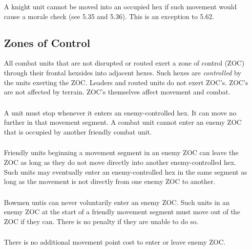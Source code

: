 \subsubsection[Knights and Stacking]{} A knight unit cannot be moved into an occupied hex if such movement would cause a morale check (see 5.35 and 5.36). This is an exception to 5.62.

\subsection{Zones of Control}

All combat units that are not disrupted or routed exert a zone of control (ZOC) through their frontal hexsides into adjacent hexes. Such hexes are \textit{controlled} by the units exerting the ZOC. Leaders and routed units do not exert ZOC's. ZOC's are not affected by terrain. ZOC's themselves affect movement and combat.

\subsubsection[Stopping Movement]{} A unit must stop whenever it enters an enemy-controlled hex. It can move no further in that movement segment. A combat unit cannot enter an enemy ZOC that is occupied by another friendly combat unit.

\subsubsection[Leaving a ZOC]{} Friendly units beginning a movement segment in an enemy ZOC can leave the ZOC as long as they do not move directly into another enemy-controlled hex. Such units may eventually enter an enemy-controlled hex in the same segment as long as the movement is not directly from one enemy ZOC to another.

\subsubsection[Bowmen and ZOCs]{} Bowmen untis can never voluntarily enter an enemy ZOC. Such units in an enemy ZOC at the start of a friendly movement segment must move out of the ZOC if they can. There is no penalty if they are unable to do so.

\subsubsection[MP and ZOCs]{} There is no additional movement point cost to enter or leave enemy ZOC.

